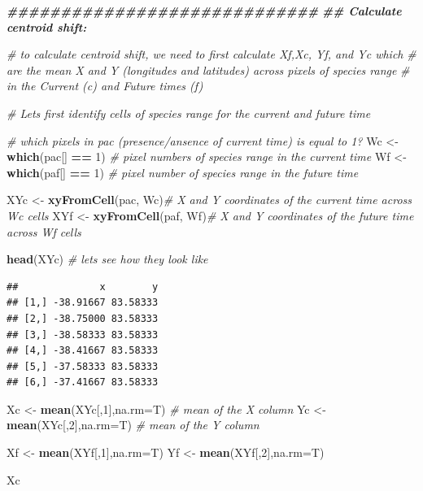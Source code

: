 \documentclass[
]{article}
\newenvironment{Shaded}{\begin{snugshade}}{\end{snugshade}}
\newcommand{\AttributeTok}[1]{\textcolor[rgb]{0.13,0.29,0.53}{#1}}
\newcommand{\CommentTok}[1]{\textcolor[rgb]{0.56,0.35,0.01}{\textit{#1}}}
\newcommand{\DecValTok}[1]{\textcolor[rgb]{0.00,0.00,0.81}{#1}}
\newcommand{\DocumentationTok}[1]{\textcolor[rgb]{0.56,0.35,0.01}{\textbf{\textit{#1}}}}
\newcommand{\FunctionTok}[1]{\textcolor[rgb]{0.13,0.29,0.53}{\textbf{#1}}}
\newcommand{\NormalTok}[1]{#1}
\newcommand{\OtherTok}[1]{\textcolor[rgb]{0.56,0.35,0.01}{#1}}
\newcommand{\SpecialCharTok}[1]{\textcolor[rgb]{0.81,0.36,0.00}{\textbf{#1}}}
\begin{document}
\begin{Shaded}
\begin{Highlighting}[]
\DocumentationTok{\#\#\#\#\#\#\#\#\#\#\#\#\#\#\#\#\#\#\#\#\#\#\#\#\#\#\#\#\#}
\DocumentationTok{\#\# Calculate centroid shift:}

\CommentTok{\# to calculate centroid shift, we need to first calculate Xf,Xc, Yf, and Yc which }
\CommentTok{\# are the mean X and Y (longitudes and latitudes) across pixels of species range }
\CommentTok{\# in the Current (c) and Future times (f)}

\CommentTok{\# Let\textquotesingle{}s first identify cells of species range for the current and future time}

\CommentTok{\# which pixels in pac (presence/ansence of current time) is equal to 1?}
\NormalTok{Wc }\OtherTok{\textless{}{-}} \FunctionTok{which}\NormalTok{(pac[] }\SpecialCharTok{==} \DecValTok{1}\NormalTok{) }\CommentTok{\# pixel numbers of species range in the current time}
\NormalTok{Wf }\OtherTok{\textless{}{-}} \FunctionTok{which}\NormalTok{(paf[] }\SpecialCharTok{==} \DecValTok{1}\NormalTok{) }\CommentTok{\# pixel number of species range in the future time}

\NormalTok{XYc }\OtherTok{\textless{}{-}} \FunctionTok{xyFromCell}\NormalTok{(pac, Wc)}\CommentTok{\# X and Y coordinates of the current time across Wc cells}
\NormalTok{XYf }\OtherTok{\textless{}{-}} \FunctionTok{xyFromCell}\NormalTok{(paf, Wf)}\CommentTok{\# X and Y coordinates of the future time across Wf cells}


\FunctionTok{head}\NormalTok{(XYc) }\CommentTok{\# let\textquotesingle{}s see how they look like}
\end{Highlighting}
\end{Shaded}

\begin{verbatim}
##              x        y
## [1,] -38.91667 83.58333
## [2,] -38.75000 83.58333
## [3,] -38.58333 83.58333
## [4,] -38.41667 83.58333
## [5,] -37.58333 83.58333
## [6,] -37.41667 83.58333
\end{verbatim}

\begin{Shaded}
\begin{Highlighting}[]
\NormalTok{Xc }\OtherTok{\textless{}{-}} \FunctionTok{mean}\NormalTok{(XYc[,}\DecValTok{1}\NormalTok{],}\AttributeTok{na.rm=}\NormalTok{T) }\CommentTok{\# mean of the X column}
\NormalTok{Yc }\OtherTok{\textless{}{-}} \FunctionTok{mean}\NormalTok{(XYc[,}\DecValTok{2}\NormalTok{],}\AttributeTok{na.rm=}\NormalTok{T) }\CommentTok{\# mean of the Y column}

\NormalTok{Xf }\OtherTok{\textless{}{-}} \FunctionTok{mean}\NormalTok{(XYf[,}\DecValTok{1}\NormalTok{],}\AttributeTok{na.rm=}\NormalTok{T) }
\NormalTok{Yf }\OtherTok{\textless{}{-}} \FunctionTok{mean}\NormalTok{(XYf[,}\DecValTok{2}\NormalTok{],}\AttributeTok{na.rm=}\NormalTok{T) }

\NormalTok{Xc}
\end{Highlighting}
\end{Shaded}
\end{document}
